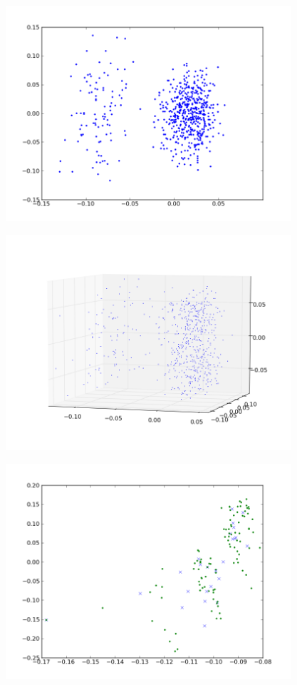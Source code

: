 \documentclass[12pt,fleqn]{article}\usepackage{../common}
\begin{document}
\includegraphics[height=8cm]{2d.png}



\includegraphics[height=8cm]{3d.png}



\includegraphics[height=8cm]{wordsvd.png}
\end{document}
